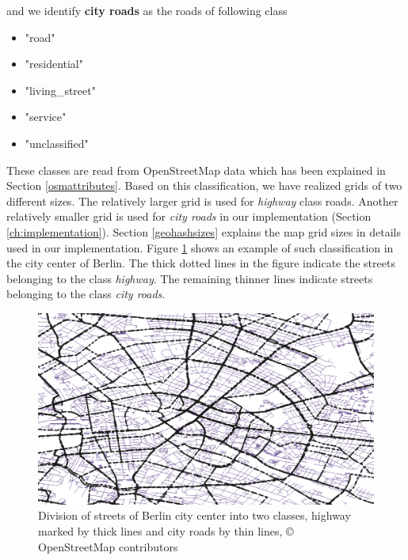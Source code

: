 and we identify \textbf{city roads} as the roads of following class
\begin{itemize}
\item "road"
\item "residential"
\item "living{\_}street"
\item "service"
\item "unclassified"
\end{itemize} 


These classes are read from OpenStreetMap data which has been explained in Section \ref{osmattributes}. Based on this classification, we have realized grids of two different sizes. The relatively larger grid is used for \textit{highway} class roads. Another relatively smaller grid is used for \textit{city roads} in our implementation (Section \ref{ch:implementation}). Section \ref{geohashsizes} explains the map grid sizes in details used in our implementation. Figure \ref{fg:diffroads} shows an example of such classification in the city center of Berlin. The thick dotted lines in the figure indicate the streets belonging to the class \textit{highway}. The remaining thinner lines indicate streets belonging to the class \textit{city roads}. 


\begin{figure}
\centering
\includegraphics[scale=.65]{berlincity.png}
\caption{Division of streets of Berlin city center into two classes, highway marked by thick lines and city roads by thin lines, {\copyright} OpenStreetMap contributors }
\label{fg:diffroads}
\end{figure}  



